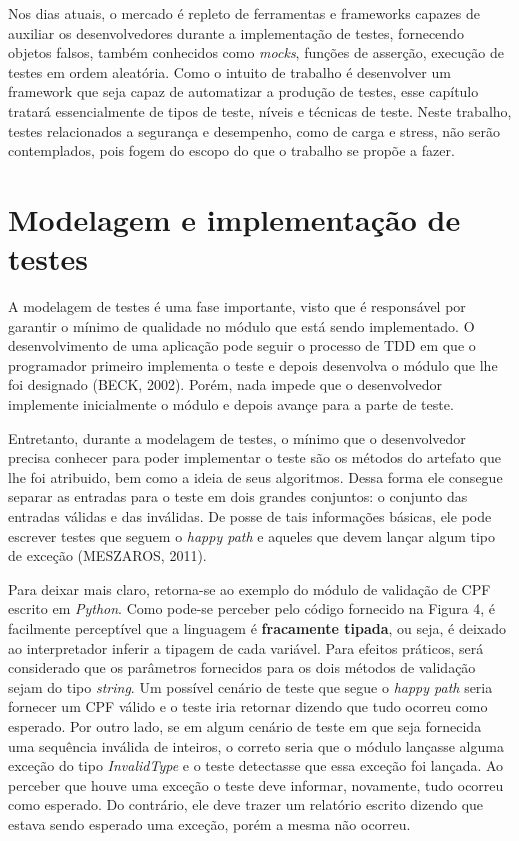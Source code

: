 \documentclass[
    12pt,       %
    openright,      %
    twoside,      %
    a4paper,      %
    english,      %
    french,       %
    spanish,      %
    brazil,       %
    ]{abntex2}
\begin{document}
      Nos dias atuais, o mercado é repleto de ferramentas e frameworks capazes de
      auxiliar os desenvolvedores durante a implementação de testes, fornecendo
      objetos falsos, também conhecidos como \textit{mocks}, funções de asserção,
      execução de testes em ordem aleatória. Como o intuito de trabalho é desenvolver
      um framework que seja capaz de automatizar a produção de testes, esse capítulo
      tratará essencialmente de tipos de teste, níveis e técnicas de teste. Neste trabalho,
      testes relacionados a segurança e desempenho, como de carga e stress, não serão
      contemplados, pois fogem do escopo do que o trabalho se propõe a fazer.

      \section{Modelagem e implementação de testes}
          A modelagem de testes é uma fase importante, visto que é responsável
          por garantir o mínimo de qualidade no módulo que está sendo implementado.
          O desenvolvimento de uma aplicação pode seguir o processo de TDD em que o
          programador primeiro implementa o teste e depois desenvolva o módulo que
          lhe foi designado (BECK, 2002). Porém, nada impede que o desenvolvedor implemente
          inicialmente o módulo e depois avançe para a parte de teste.

          Entretanto, durante a modelagem de testes, o mínimo que o desenvolvedor precisa
          conhecer para poder implementar o teste são os métodos do artefato que
          lhe foi atribuido, bem como a ideia de seus algoritmos. Dessa forma ele
          consegue separar as entradas para o teste em dois grandes conjuntos: o
          conjunto das entradas válidas e das inválidas. De posse de tais informações
          básicas, ele pode escrever testes que seguem o \textit{happy path} e aqueles
          que devem lançar algum tipo de exceção (MESZAROS, 2011).

          Para deixar mais claro, retorna-se ao exemplo do módulo de validação de CPF
          escrito em \textit{Python}. Como pode-se perceber pelo código fornecido na
          Figura 4, é facilmente perceptível que a linguagem é \textbf{fracamente tipada},
          ou seja, é deixado ao interpretador inferir a tipagem de cada variável. Para
          efeitos práticos, será considerado que os parâmetros fornecidos para os dois
          métodos de validação sejam do tipo \textit{string}. Um possível cenário de teste
          que segue o \textit{happy path} seria fornecer um CPF válido e o teste iria
          retornar dizendo que tudo ocorreu como esperado. Por outro lado, se em algum
          cenário de teste em que seja fornecida uma sequência inválida de inteiros, o correto
          seria que o módulo lançasse alguma exceção do tipo \textit{InvalidType} e o
          teste detectasse que essa exceção foi lançada. Ao perceber que houve uma exceção
          o teste deve informar, novamente, tudo ocorreu como esperado. Do contrário, ele
          deve trazer um relatório escrito dizendo que estava sendo esperado uma exceção,
          porém a mesma não ocorreu.
\end{document}
